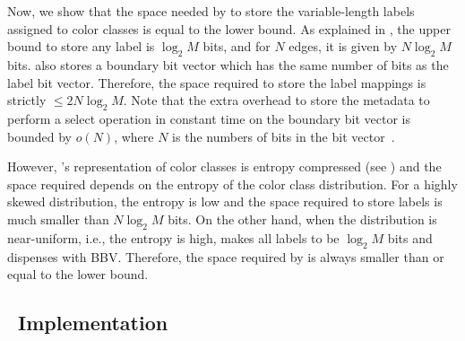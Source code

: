 Now, we show that the space needed by \system to store the variable-length
labels assigned to color classes is equal to the lower bound. As explained in
, the upper bound to store any label is $\log_2{M}$ bits,
and for $N$ edges, it is given by $N\log_2{M}$ bits.  \system also stores a
boundary bit vector which has the same number of bits as the label bit vector.
Therefore, the space required to store the label mappings is strictly $\leq
2N\log_2{M}$. Note that the extra overhead to store the metadata to perform a
select operation in constant time on the boundary bit vector is bounded by
$o(N)$, where $N$ is the numbers of bits in the bit
vector~\cite{GonzalezGrMa05}.

However, \system's representation of color classes is entropy compressed (see
) and the space required depends on the entropy of the color class
distribution. For a highly skewed distribution, the entropy is low and the space
required to store labels is much smaller than $N\log_2{M}$ bits. On the other
hand, when the distribution is near-uniform, i.e., the entropy is high, \system
makes all labels to be $\log_2{M}$ bits and dispenses with BBV. Therefore, the
space required by \system is always smaller than or equal to the lower bound.



\subsection{~Implementation}


